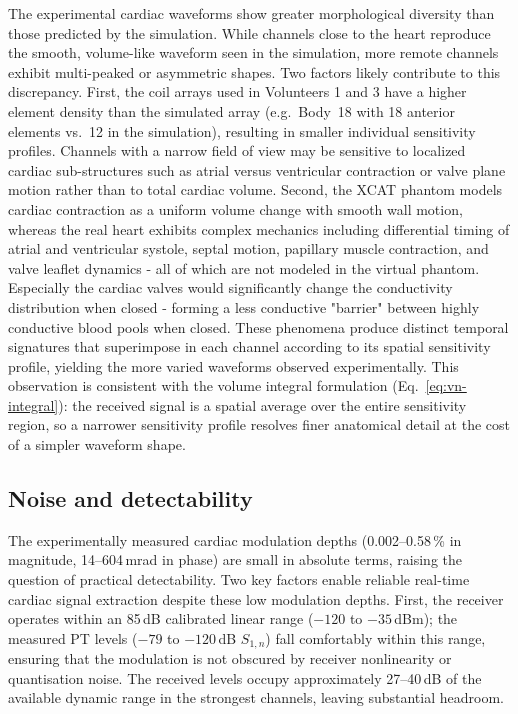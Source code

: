 \documentclass[
]{article}
\begin{document}
The experimental cardiac waveforms show greater morphological diversity than those predicted by the simulation. While channels close to the heart reproduce the smooth, volume-like waveform seen in the simulation, more remote channels exhibit multi-peaked or asymmetric shapes. Two factors likely contribute to this discrepancy. First, the coil arrays used in Volunteers 1 and 3 have a higher element density than the simulated array (e.g.\ Body~18 with 18 anterior elements vs.\ 12 in the simulation), resulting in smaller individual sensitivity profiles. Channels with a narrow field of view may be sensitive to localized cardiac sub-structures such as atrial versus ventricular contraction or valve plane motion rather than to total cardiac volume. Second, the XCAT phantom models cardiac contraction as a uniform volume change with smooth wall motion, whereas the real heart exhibits complex mechanics including differential timing of atrial and ventricular systole, septal motion, papillary muscle contraction, and valve leaflet dynamics - all of which are not modeled in the virtual phantom. Especially the cardiac valves would significantly change the conductivity distribution when closed - forming a less conductive "barrier" between highly conductive blood pools when closed. These phenomena produce distinct temporal signatures that superimpose in each channel according to its spatial sensitivity profile, yielding the more varied waveforms observed experimentally. This observation is consistent with the volume integral formulation (Eq.~\ref{eq:vn-integral}): the received signal is a spatial average over the entire sensitivity region, so a narrower sensitivity profile resolves finer anatomical detail at the cost of a simpler waveform shape.

\subsection{Noise and detectability}\label{noise-detectability}

The experimentally measured cardiac modulation depths (0.002--0.58\,\% in magnitude, 14--604\,mrad in phase) are small in absolute terms, raising the question of practical detectability. Two key factors enable reliable real-time cardiac signal extraction despite these low modulation depths. First, the receiver operates within an 85\,dB calibrated linear range ($-120$ to $-35$\,dBm); the measured PT levels ($-79$ to $-120$\,dB $S_{1,n}$) fall comfortably within this range, ensuring that the modulation is not obscured by receiver nonlinearity or quantisation noise. The received levels occupy approximately 27--40\,dB of the available dynamic range in the strongest channels, leaving substantial headroom.
\end{document}
